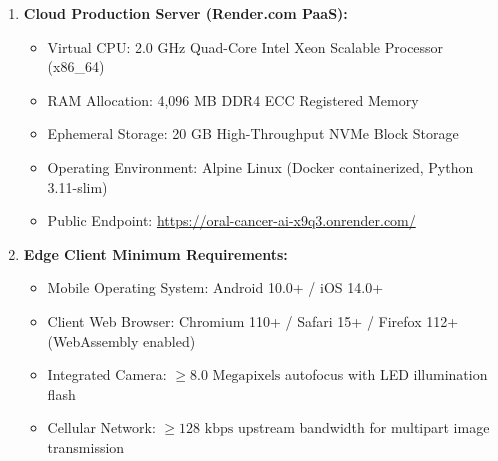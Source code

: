 \documentclass[12pt,a4paper,oneside]{report}
\begin{document}
\begin{enumerate}
    \item \textbf{Cloud Production Server (Render.com PaaS):}
    \begin{itemize}
        \item Virtual CPU: 2.0 GHz Quad-Core Intel Xeon Scalable Processor (x86\_64)
        \item RAM Allocation: 4,096 MB DDR4 ECC Registered Memory
        \item Ephemeral Storage: 20 GB High-Throughput NVMe Block Storage
        \item Operating Environment: Alpine Linux (Docker containerized, Python 3.11-slim)
        \item Public Endpoint: \url{https://oral-cancer-ai-x9q3.onrender.com/}
    \end{itemize}
    \item \textbf{Edge Client Minimum Requirements:}
    \begin{itemize}
        \item Mobile Operating System: Android 10.0+ / iOS 14.0+
        \item Client Web Browser: Chromium 110+ / Safari 15+ / Firefox 112+ (WebAssembly enabled)
        \item Integrated Camera: $\ge 8.0\text{ Megapixels}$ autofocus with LED illumination flash
        \item Cellular Network: $\ge 128\text{ kbps}$ upstream bandwidth for multipart image transmission
    \end{itemize}
\end{enumerate}
\end{document}
